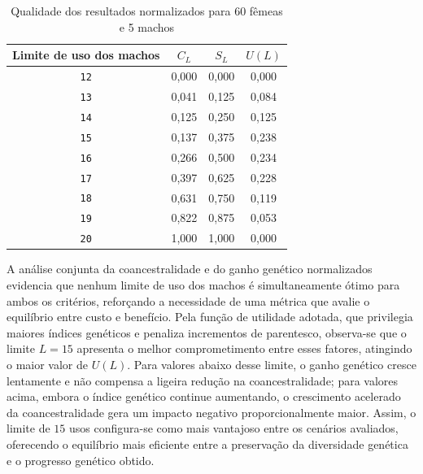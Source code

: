 \begin{center}
\begin{longtable}{|c|c|c|c|}
\caption{Qualidade dos resultados normalizados para 60 fêmeas e 5 machos} \label{resultados_normalizados} \\ \hline
\textbf{Limite de uso dos machos} & $C_L$ & $S_L$ & $U(L)$\\ \hline
\texttt{12} & 0,000 & 0,000 & 0,000 \\ \hline
\texttt{13} & 0,041 & 0,125 & 0,084\\ \hline
\texttt{14} & 0,125 & 0,250 & 0,125\\ \hline
\texttt{15} & 0,137 & 0,375 & 0,238 \\ \hline
\texttt{16} & 0,266 & 0,500 & 0,234 \\ \hline
\texttt{17} & 0,397 & 0,625 & 0,228 \\ \hline
\texttt{18} & 0,631 & 0,750 & 0,119 \\ \hline
\texttt{19} & 0,822 & 0,875 & 0,053 \\ \hline 
\texttt{20} & 1,000 & 1,000 & 0,000 \\ \hline
\end{longtable}
\end{center}
A análise conjunta da coancestralidade e do ganho genético normalizados evidencia que nenhum limite de uso dos machos é simultaneamente ótimo para ambos os critérios, reforçando a necessidade de uma métrica que avalie o equilíbrio entre custo e benefício. Pela função de utilidade adotada, que privilegia maiores índices genéticos e penaliza incrementos de parentesco, observa-se que o limite \(L = 15\) apresenta o melhor comprometimento entre esses fatores, atingindo o maior valor de \(U(L)\). Para valores abaixo desse limite, o ganho genético cresce lentamente e não compensa a ligeira redução na coancestralidade; para valores acima, embora o índice genético continue aumentando, o crescimento acelerado da coancestralidade gera um impacto negativo proporcionalmente maior. Assim, o limite de \(15\) usos configura-se como mais vantajoso entre os cenários avaliados, oferecendo o equilíbrio mais eficiente entre a preservação da diversidade genética e o progresso genético obtido.
